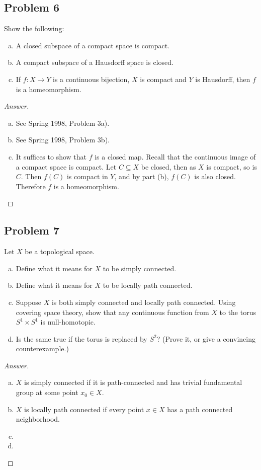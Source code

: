\documentclass[12pt]{article}
\theoremstyle{definition}
\begin{document}
\subsection{Problem 6}
Show the following:
\begin{enumerate}[(a)]
    \item A closed subspace of a compact space is compact.
    \item A compact subspace of a Hausdorff space is closed.
    \item If $f : X \to Y$ is a continuous bijection, $X$ is compact and $Y$ is Hausdorff, then $f$ is a homeomorphism.
\end{enumerate}
\begin{proof}[Answer]
    \noindent
    \begin{enumerate}[(a)]
        \item See Spring 1998, Problem 3a).
        \item See Spring 1998, Problem 3b).
        \item It suffices to show that $f$ is a closed map. Recall that the continuous image of a compact space is compact. Let $C \subseteq X$ be closed, then as $X$ is compact, so is $C$. Then $f(C)$ is compact in $Y$, and by part (b), $f(C)$ is also closed. Therefore $f$ is a homeomorphism.
    \end{enumerate}
\end{proof}
\subsection{Problem 7}
Let $X$ be a topological space.
\begin{enumerate}[(a)]
    \item Define what it means for $X$ to be simply connected.
    \item Define what it means for $X$ to be locally path connected.
    \item Suppose $X$ is both simply connected and locally path connected. Using covering space theory, show that any continuous function from $X$ to the torus $S^1 \times S^1$ is null-homotopic.
    \item Is the same true if the torus is replaced by $S^2$? (Prove it, or give a convincing counterexample.)
\end{enumerate}
\begin{proof}[Answer]
    \noindent
    \begin{enumerate}[(a)]
        \item $X$ is simply connected if it is path-connected and has trivial fundamental group at some point $x_0 \in X$. 
        \item $X$ is locally path connected if every point $x \in X$ has a path connected neighborhood.
        \item 
        \item 
    \end{enumerate}
\end{proof}
\newpage
\end{document}
